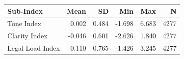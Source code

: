 \begin{tabular}{lrrrrr}
\toprule
Sub-Index & Mean & SD & Min & Max & N \\
\midrule
Tone Index & 0.002 & 0.484 & -1.698 & 6.683 & 4277 \\
Clarity Index & -0.046 & 0.601 & -2.626 & 1.840 & 4277 \\
Legal Load Index & 0.110 & 0.765 & -1.426 & 3.245 & 4277 \\
\bottomrule
\end{tabular}

